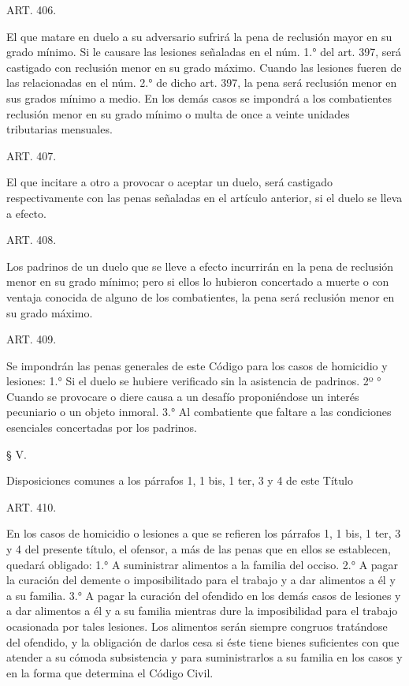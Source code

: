     ART. 406.

    El que matare en duelo a su adversario sufrirá la pena de reclusión mayor en su grado mínimo.
    Si le causare las lesiones señaladas en el núm. 1.° del art. 397, será castigado con reclusión menor en su grado máximo.
    Cuando las lesiones fueren de las relacionadas en el núm. 2.° de dicho art. 397, la pena será reclusión menor en sus grados mínimo a medio.
    En los demás casos se impondrá a los combatientes reclusión menor en su grado mínimo o multa de once a veinte unidades tributarias mensuales.








    ART. 407.

    El que incitare a otro a provocar o aceptar un duelo, será castigado respectivamente con las penas señaladas en el artículo anterior, si el duelo se lleva a efecto.



    ART. 408.

    Los padrinos de un duelo que se lleve a efecto incurrirán en la pena de reclusión menor en su grado mínimo; pero si ellos lo hubieron concertado a muerte o con ventaja conocida de alguno de los combatientes, la pena será reclusión menor en su grado máximo.



    ART. 409.

    Se impondrán las penas generales de este Código para los casos de homicidio y lesiones:
    1.° Si el duelo se hubiere verificado sin la asistencia de padrinos.
    2º ° Cuando se provocare o diere causa a un desafío proponiéndose un interés pecuniario o un objeto inmoral.
    3.° Al combatiente que faltare a las condiciones esenciales concertadas por los padrinos.


    § V.

    Disposiciones comunes a los párrafos 1, 1 bis, 1 ter, 3 y 4 de este Título



    ART. 410.

    En los casos de homicidio o lesiones a que se refieren los párrafos 1, 1 bis, 1 ter, 3 y 4 del presente título, el ofensor, a más de las penas que en ellos se establecen, quedará obligado:
    1.° A suministrar alimentos a la familia del occiso.
    2.° A pagar la curación del demente o imposibilitado para el trabajo y a dar alimentos a él y a su familia.
    3.° A pagar la curación del ofendido en los demás casos de lesiones y a dar alimentos a él y a su familia mientras dure la imposibilidad para el trabajo ocasionada por tales lesiones.
    Los alimentos serán siempre congruos tratándose del ofendido, y la obligación de darlos cesa si éste tiene bienes suficientes con que atender a su cómoda subsistencia y para suministrarlos a su familia en los casos y en la forma que determina el Código Civil.




